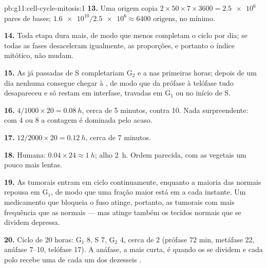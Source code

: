 \begin{solution}{pb:g11:cell-cycle-mitosis:1}
\textbf{13.} Uma origem copia $2 \times 50 \times 7 \times 3600 =
\num{2.5e6}$ pares de bases; $\num{1.6e10}/\num{2.5e6} \approx 6400$
origens, no mínimo.

\textbf{14.} Toda etapa dura mais, de modo que menos  completam
o ciclo por dia; se todas as fases desaceleram igualmente, as
proporções, e portanto o índice mitótico, não mudam.

\textbf{15.} As  já passadas de S completariam $\mathrm{G_2}$ e
a  nas primeiras horas; depois de um dia nenhuma  consegue
chegar à , de modo que da prófase à telófase tudo desapareceu e
só restam  em interfase, travadas em $\mathrm{G_1}$ ou no início
de S.

\textbf{16.} $4/1000 \times 20 = \qty{0.08}{h}$, cerca de 5 minutos,
contra 10. Nada surpreendente: com 4 ou 8  a contagem é dominada
pelo acaso.

\textbf{17.} $12/2000 \times 20 = \qty{0.12}{h}$, cerca de 7 minutos.

\textbf{18.} Humana: $0.04 \times 24 \approx \qty{1}{h}$; alho
\qty{2}{h}. Ordem parecida, com as  vegetais um pouco mais lentas.

\textbf{19.} As  tumorais entram em ciclo continuamente,
enquanto a maioria das  normais repousa em $\mathrm{G_1}$, de
modo que uma fração maior está em  a cada instante. Um
medicamento que bloqueia o fuso atinge, portanto, as  tumorais
com mais frequência que as normais --- mas atinge também os tecidos
normais que se dividem depressa.

\textbf{20.} Ciclo de 20 horas: $\mathrm{G_1}$ 8, S 7, $\mathrm{G_2}$
4,  cerca de 2 (prófase 72 min, metáfase 22, anáfase 7--10,
telófase 17). A anáfase, a mais curta, é quando os  se
dividem e cada polo recebe uma  de cada um dos dezesseis
.
\end{solution}
